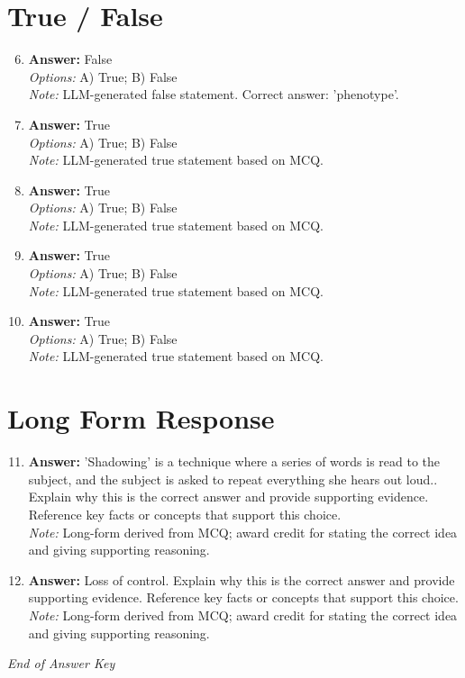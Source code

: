 \documentclass[12pt]{article}
\begin{document}
\section*{True / False}
\begin{enumerate}[label=\arabic*.]
\setcounter{enumi}{5}
\item \textbf{Answer:} False
\\ \textit{Options:} A) True; B) False
\\ \textit{Note:} LLM-generated false statement. Correct answer: 'phenotype'.
\item \textbf{Answer:} True
\\ \textit{Options:} A) True; B) False
\\ \textit{Note:} LLM-generated true statement based on MCQ.
\item \textbf{Answer:} True
\\ \textit{Options:} A) True; B) False
\\ \textit{Note:} LLM-generated true statement based on MCQ.
\item \textbf{Answer:} True
\\ \textit{Options:} A) True; B) False
\\ \textit{Note:} LLM-generated true statement based on MCQ.
\item \textbf{Answer:} True
\\ \textit{Options:} A) True; B) False
\\ \textit{Note:} LLM-generated true statement based on MCQ.
\end{enumerate}

\section*{Long Form Response}
\begin{enumerate}[label=\arabic*.]
\setcounter{enumi}{10}
\item \textbf{Answer:} 'Shadowing' is a technique where a series of words is read to the subject, and the subject is asked to repeat everything she hears out loud.. Explain why this is the correct answer and provide supporting evidence. Reference key facts or concepts that support this choice.
\\ \textit{Note:} Long-form derived from MCQ; award credit for stating the correct idea and giving supporting reasoning.
\item \textbf{Answer:} Loss of control. Explain why this is the correct answer and provide supporting evidence. Reference key facts or concepts that support this choice.
\\ \textit{Note:} Long-form derived from MCQ; award credit for stating the correct idea and giving supporting reasoning.
\end{enumerate}

\vfill
\noindent\textit{End of Answer Key}
\end{document}
